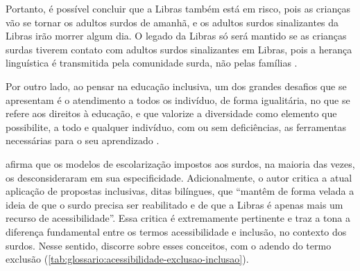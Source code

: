 Portanto, é possível concluir que a Libras também está em risco, pois as crianças vão se tornar os adultos surdos de amanhã, e os adultos surdos sinalizantes da Libras irão morrer algum dia. O legado da Libras só será mantido se as crianças surdas tiverem contato com adultos surdos sinalizantes em Libras, pois a herança linguística é transmitida pela comunidade surda, não pelas famílias \cite{Quadros2019}.

Por outro lado, ao pensar na educação inclusiva, um dos grandes desafios que se apresentam é o atendimento a todos os indivíduo, de forma igualitária, no que se refere aos direitos à educação, e que valorize a diversidade como elemento que possibilite, a todo e qualquer indivíduo, com ou sem deficiências, as ferramentas necessárias para o seu aprendizado \cite{Almeida2015}.

 afirma que os modelos de escolarização impostos aos surdos, na maioria das vezes, os desconsideraram em sua especificidade. Adicionalmente, o autor critica a atual aplicação de propostas inclusivas, ditas bilíngues, que ``mantêm de forma velada a ideia de que o surdo precisa ser reabilitado e de que a Libras é apenas mais um recurso de acessibilidade''. Essa critica é extremamente pertinente e traz a tona a diferença fundamental entre os termos acessibilidade e inclusão, no contexto dos surdos. Nesse sentido,  discorre sobre esses conceitos, com o adendo do termo exclusão (\autoref{tab:glossario:acessibilidade-exclusao-inclusao}).

